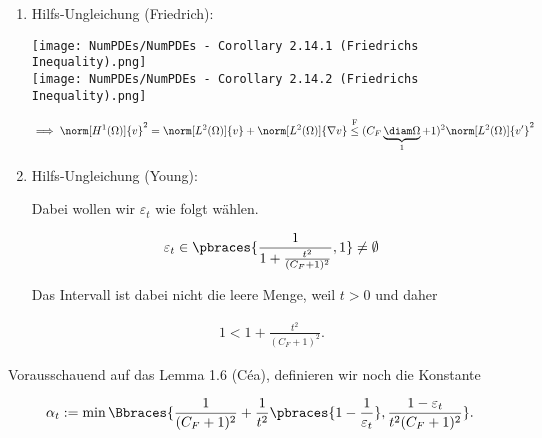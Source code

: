 \begin{solution}
\begin{enumerate}[label = \textbf{\alph*)}]
\begin{enumerate}[label = \arabic*.]
    \begin{enumerate}[label = \arabic*.]

      \item Hilfs-Ungleichung (Friedrich):

      \begin{center}
        \texttt{[image: NumPDEs/NumPDEs - Corollary 2.14.1 (Friedrichs Inequality).png]} \\
        \texttt{[image: NumPDEs/NumPDEs - Corollary 2.14.2 (Friedrichs Inequality).png]}
      \end{center}

      \begin{align*}
        \implies
        \norm[H^1(\Omega)]{v}^2
        =
        \norm[L^2(\Omega)]{v}
        +
        \norm[L^2(\Omega)]{\nabla v}
        \stackrel
        {
          \mathrm{F}
        }{\leq}
        (
          C_F
          \underbrace{\diam \Omega}_1
          +
          1
        )^2
        \norm[L^2(\Omega)]{v^\prime}^2
      \end{align*}

      \item Hilfs-Ungleichung (Young):

      Dabei wollen wir $\varepsilon_t$ wie folgt wählen.

      \begin{align*}
        \varepsilon_t
        \in
        \pbraces
        {
          \frac{1}
          {
            1
            +
            \frac{t^2}{(C_F + 1)^2}
          },
          1
        }
        \neq
        \emptyset
      \end{align*}

      Das Intervall ist dabei nicht die leere Menge, weil $t > 0$ und daher

      \begin{align*}
        1 < 1 + \frac{t^2}{(C_F + 1)^2}.
      \end{align*}

    \end{enumerate}

    Vorausschauend auf das Lemma 1.6 (Céa), definieren wir noch die Konstante

    \begin{align*}
      \alpha_t
      :=
      \min
      \Bbraces
      {
        \frac{1}{(C_F + 1)^2}
        +
        \frac{1}{t^2}
        \pbraces
        {
          1 - \frac{1}{\varepsilon_t}
        },
        \frac
        {
          1 - \varepsilon_t
        }{
          t^2 (C_F + 1)^2
        }
      }.
    \end{align*}


\end{enumerate}
\end{enumerate}
\end{solution}
